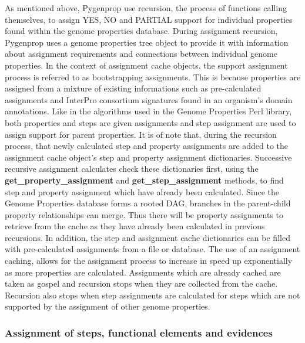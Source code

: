 As mentioned above, Pygenprop use recursion, the process of functions calling themselves, to assign YES, NO and PARTIAL support for individual properties found within the genome properties database. During assignment recursion, Pygenprop uses a genome properties tree object to provide it with information about assignment requirements and connections between individual genome properties. In the context of assignment cache objects, the support assignment process is referred to as bootstrapping assignments. This is because properties are assigned from a mixture of existing informations such as pre-calculated assignments and InterPro consortium signatures found in an organism's domain annotations. Like in the algorithms used in the Genome Properties Perl library, both properties and steps are given assignments and step assignment are used to assign support for parent properties. It is of note that, during the recursion process, that newly calculated step and property assignments are added to the assignment cache object's step and property assignment dictionaries. Successive recursive assignment calculates check these dictionaries first, using the \textbf{get\_property\_assignment} and  \textbf{get\_step\_assignment} methods, to find step and property assignment which have already been calculated. Since the Genome Properties database forms a rooted DAG, branches in the parent-child property relationships can merge. Thus there will be property assignments to retrieve from the cache as they have already been calculated in previous recursions. In addition, the step and assignment cache dictionaries can be filled with pre-calculated assignments from a file or database. The use of an assignment caching, allows for the assignment process to increase in speed up exponentially as more properties are calculated. Assignments which are already cached are taken as gospel and recursion stops when they are collected from the cache. Recursion also stops when step assignments are calculated for steps which are not supported by the assignment of other genome properties. 

\subsubsection{Assignment of steps, functional elements and evidences}

